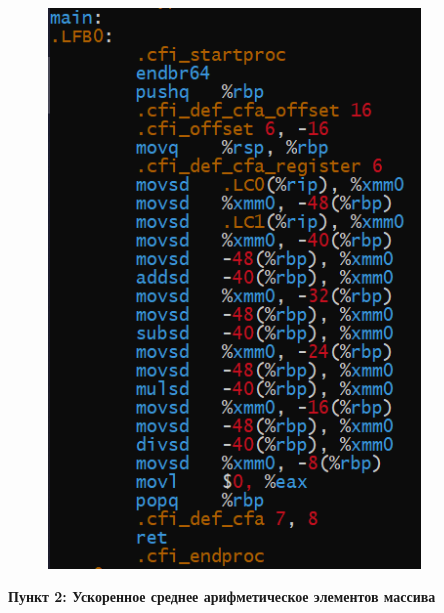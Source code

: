 \documentclass[a4paper,12pt]{article}
\begin{document}
\begin{figure}[H]
{\begin{minipage}[t]{0.4\textwidth}
        \includegraphics[width = 0.88\textwidth]{Операции double листинг.png}
    \end{minipage}}
\end{figure}

\textbf{Пункт 2: Ускоренное среднее арифметическое элементов массива}
\end{document}
